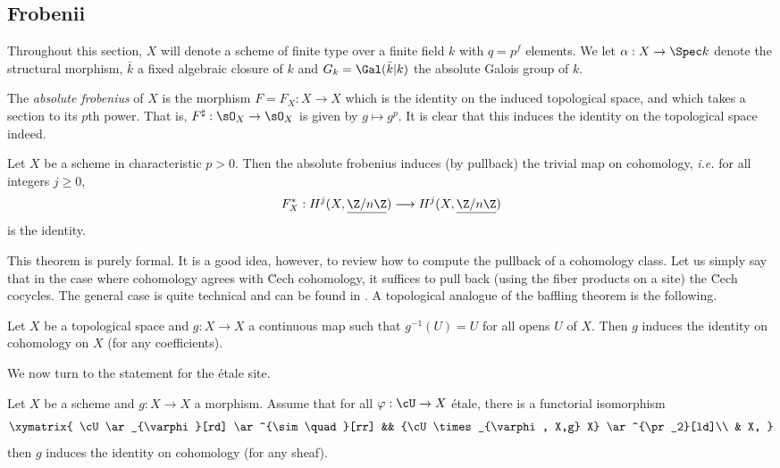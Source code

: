 \subsection{Frobenii}
\label{subsection:Frobenii}

Throughout this section, $X$ will denote a scheme of finite type over a finite field $k$ with $q = p^f$ elements. We let $\alpha : X \to \Spec k$ denote the structural morphism, $\bar k$ a fixed algebraic closure of $k$ and $G_k = \Gal(\bar k | k)$ the absolute Galois group of $k$.

\begin{defi}
The \emph{absolute frobenius} of $X$ is the morphism $F = F_X : X \to X$ which is the identity on the induced topological space, and which takes a section to its $p$th power. That is, $F^\sharp : \sO_X \to \sO_X$ is given by $g \mapsto g^p$. It is clear that this induces the identity on the topological space indeed.
\end{defi}

\begin{thm} \label{thm:TheBafflingTheorem}
Let $X$ be a scheme in characteristic $p>0$. Then the absolute frobenius induces (by pullback) the trivial map on cohomology, {\it i.e.} for all integers $j\geqslant 0$,
$$
F_X^* : H^j (X, \underline{\Z/n\Z}) \longrightarrow  H^j (X, \underline{\Z/n\Z})
$$
is the identity.
\end{thm}

This theorem is purely formal. It is a good idea, however, to review how to compute the pullback of a cohomology class. Let us simply say that in the case where cohomology agrees with \u Cech cohomology, it suffices to pull back (using the fiber products on a site) the \u Cech cocycles. The general case is quite technical and can be found in \cite[somewhere]{Stacks}. A topological analogue of the baffling theorem is the following.

\begin{exo}
Let $X$ be a topological space and $g : X \to X$ a continuous map such that $g^{-1}(U) = U$ for all opens $U$ of $X$. Then $g$ induces the identity on cohomology on $X$ (for any coefficients).
\end{exo}

We now turn to the statement for the \'etale site.

\begin{lem} \label{lem:FormalStuffForBafflingThm}
Let $X$ be a scheme and $g : X \to X$ a morphism. Assume that for all $\varphi: \cU \to X$ \'etale, there is a functorial isomorphism 
$$
\xymatrix{
\cU \ar_{\varphi}[rd] \ar^{\sim \quad}[rr] &&  {\cU \times_{\varphi, X,g} X} \ar^{\pr_2}[ld]\\
& X,
}
$$
then $g$ induces the identity on cohomology (for any sheaf). 
\end{lem}

